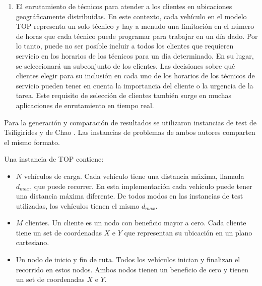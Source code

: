 \begin{enumerate}[i]
\item

El enrutamiento de técnicos para atender a los clientes en ubicaciones geográficamente distribuidas. En este contexto, cada vehículo en el modelo TOP representa un solo técnico y hay a menudo una limitación en el número de horas que cada técnico puede programar para trabajar en un día dado. Por lo tanto, puede no ser posible incluir a todos los clientes que requieren servicio en los horarios de los técnicos para un día determinado. En su lugar, se seleccionará un subconjunto de los clientes. Las decisiones sobre qué clientes elegir para su inclusión en cada uno de los horarios de los técnicos de servicio pueden tener en cuenta la importancia del cliente o la urgencia de la tarea. Este requisito de selección de clientes también surge en muchas aplicaciones de enrutamiento en tiempo real.

\end{enumerate}

Para la generación y comparación de resultados se utilizaron instancias de test de Tsiligirides y de Chao \cite{IntancesChaoTsiligirides}. Las instancias de problemas de ambos autores comparten el mismo formato. 

\bigskip

\begin{minipage}{\textwidth}
Una instancia de TOP contiene:

\begin{itemize}
  \item $N$ vehículos de carga. Cada vehículo tiene una distancia máxima, llamada $d_{max}$, que puede recorrer. En esta implementación cada vehículo puede tener una distancia máxima diferente. De todos modos en las instancias de test utilizadas, los vehículos tienen el mismo $d_{max}$.
  \item $M$ clientes. Un cliente es un nodo con beneficio mayor a cero. Cada cliente tiene un set de coordenadas $X$ e $Y$ que representan su ubicación en un plano cartesiano.
  \item Un nodo de inicio y fin de ruta. Todos los vehículos inician y finalizan el recorrido en estos nodos. Ambos nodos tienen un beneficio de cero y tienen un set de coordenadas $X$ e $Y$.
\end{itemize}
\end{minipage}

\bigskip

